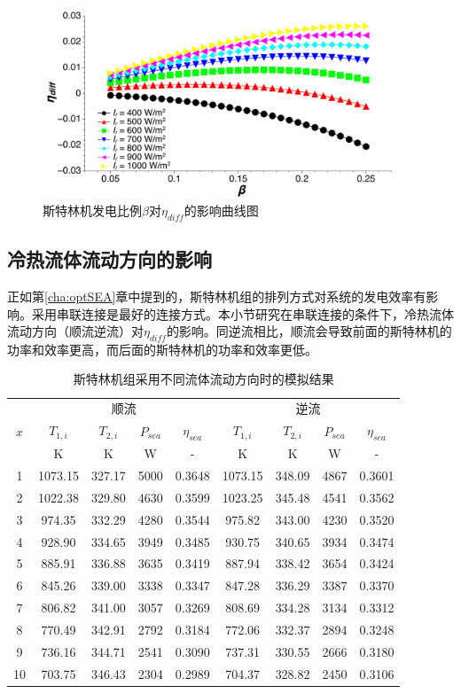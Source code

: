 \begin{figure}[H]
\centering
	\includegraphics[width = 0.8\columnwidth, angle = 0]{fig/beta-eta_diff}
	\caption{斯特林机发电比例$\beta$对$\eta_{diff}$的影响曲线图}
	\label{fig:beta-eta_diff}
\end{figure}

\subsection{冷热流体流动方向的影响}

正如第\ref{cha:optSEA}章中提到的，斯特林机组的排列方式对系统的发电效率有影响。采用串联连接是最好的连接方式。本小节研究在串联连接的条件下，冷热流体流动方向（顺流逆流）对$\eta_{diff}$的影响。同逆流相比，顺流会导致前面的斯特林机的功率和效率更高，而后面的斯特林机的功率和效率更低。

\begin{table}[htbp]
\setlength{\abovecaptionskip}{0pt}
	\caption{斯特林机组采用不同流体流动方向时的模拟结果}
	\centering
	\begin{tabular}{ccccccccc}
		\toprule
		\multirow{3}{*}{$x$}	&	\multicolumn{4}{c}{顺流}	&\multicolumn{4}{c}{逆流}\tabularnewline
		\cline{2-5}	\cline{6-9}
		&$T_{1,i}$&$T_{2,i}$&$P_{sea}$&$\eta_{sea}$&$T_{1,i}$&$T_{2,i}$&$P_{sea}$&$\eta_{sea}$\tabularnewline
		&K&K&W&-&K&K&W&-\tabularnewline
		\midrule
		1	&	1073.15	&	327.17	&	5000	&	0.3648	&	1073.15	&	348.09	&	4867	&	0.3601\\
		2	&	1022.38	&	329.80	&	4630	&	0.3599	&	1023.25	&	345.48	&	4541	&	0.3562\\
		3	&	974.35	&	332.29	&	4280	&	0.3544	&	975.82	&	343.00	&	4230	&	0.3520\\
		4	&	928.90	&	334.65	&	3949	&	0.3485	&	930.75	&	340.65	&	3934	&	0.3474\\
		5	&	885.91	&	336.88	&	3635	&	0.3419	&	887.94	&	338.42	&	3654	&	0.3424\\
		6	&	845.26	&	339.00	&	3338	&	0.3347	&	847.28	&	336.29	&	3387	&	0.3370\\
		7	&	806.82	&	341.00	&	3057	&	0.3269	&	808.69	&	334.28	&	3134	&	0.3312\\
		8	&	770.49	&	342.91	&	2792	&	0.3184	&	772.06	&	332.37	&	2894	&	0.3248\\
		9	&	736.16	&	344.71	&	2541	&	0.3090	&	737.31	&	330.55	&	2666	&	0.3180\\
		10	&	703.75	&	346.43	&	2304	&	0.2989	&	704.37	&	328.82	&	2450	&	0.3106\\
		\bottomrule
	\end{tabular}
	\label{tab:SEAresults}
\end{table}

